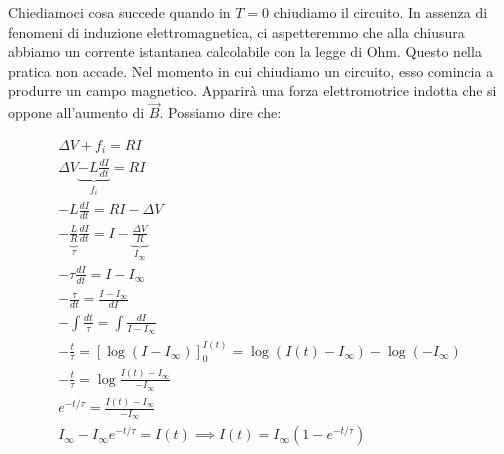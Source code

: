 \begin{figure}[htpb]
\end{figure}
\FloatBarrier

Chiediamoci cosa succede quando in $T=0$ chiudiamo il circuito.
In assenza di fenomeni di induzione elettromagnetica, ci aspetteremmo che alla chiusura abbiamo un corrente istantanea calcolabile con la legge di Ohm. Questo nella pratica non accade. Nel momento in cui chiudiamo un circuito, esso comincia a produrre un campo magnetico. Apparirà una forza elettromotrice indotta che si oppone all'aumento di $\vec{B}$. Possiamo dire che:

\begin{gather*}
	\Delta V + f_i = RI \\
	\Delta V \underbrace{-L \frac{dI}{dt}}_{f_i} = RI \\
	- L \frac{dI}{dt} = RI - \Delta V \\
	- \underbrace{\frac{L}{R}}_{\tau} \frac{dI}{dt} = I - \underbrace{\frac{\Delta V}{R}}_{I_{\infty}} \\
	-\tau \frac{dI}{dt} = I - I_{\infty} \\
	- \frac{\tau}{dt} = \frac{I-I_{\infty}}{dI} \\
	- \int \frac{dt}{\tau} = \int \frac{dI}{I-I_{\infty}} \\
	-\frac{t}{\tau} = [\log (I-I_{\infty})]_0^{I(t)} = \log (I(t)-I_{\infty})-\log (-I_{\infty} ) \\
	-\frac{t}{\tau} = \log \frac{I(t)-I_{\infty}}{-I_{\infty}} \\
	e^{-t/\tau} = \frac{I(t)-I_{\infty}}{-I_{\infty}} \\
	I_{\infty}-I_{\infty}e^{-t/\tau} = I(t) \implies \boxed{I(t)=I_{\infty}(1-e^{-t/\tau} )}
\end{gather*}

